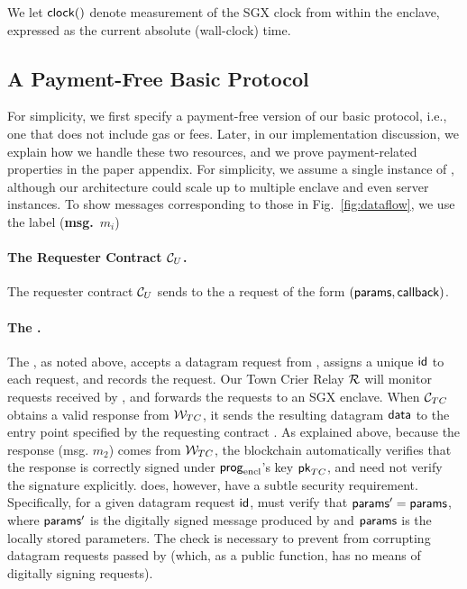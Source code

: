 We let ${{\sf clock}}()$ denote measurement of the SGX clock from within the enclave, expressed as the current absolute (wall-clock) time. 


\subsection{A Payment-Free Basic Protocol}
\label{sec:payment-free-protocol}

For simplicity, we first specify a payment-free version of our basic protocol, i.e., one that does not include gas or fees. Later, in our implementation discussion, we explain how we handle these two resources, and we prove payment-related properties in the paper appendix. For simplicity, we assume a single instance of \engine, although our architecture could scale up to multiple enclave and even server instances. To show messages corresponding to those in Fig.~\ref{fig:dataflow}, we use the label ({\bf msg.}~$m_i$)

\paragraph{The Requester Contract ${\cal C}_U$.}
The requester contract ${\cal C}_U$ sends to the \tcontract \tcont
a request of the form $({\sf params}, {\sf callback})$.

\paragraph{The \tcontract \tcont.} 
The \tcontract, as noted above, accepts a datagram request from \reqcont, 
assigns a unique ${\sf id}$ to each request, and
records the request.
Our Town Crier Relay $\mathcal{R}$ will monitor
requests received by \tcont, and 
forwards the requests to an SGX enclave.
When ${\cal C}_{TC}$ obtains a valid response
from ${\cal W}_{TC}$,   
it 
sends the resulting datagram ${\sf data}$ to the entry point \dgcallback 
specified by the requesting contract \reqcont. As explained above, because the response (msg. $m_2$) comes from ${\cal W}_{TC}$, the blockchain automatically verifies that the response is correctly signed under ${\sf prog}_{\textrm{encl}}$'s key ${\sf pk}_{TC}$, and \tcont need not verify the signature explicitly. \tc does, however, have a subtle security requirement. Specifically,  for a given datagram request ${\sf id}$, \tcont must verify that ${\sf params}' = {\sf params}$, where ${\sf params}'$ is the digitally signed message produced by \engine and ${\sf params}$ is the locally stored parameters. The check is necessary to prevent \relay from corrupting datagram requests passed by \tcont (which, as a public function, has no means of digitally signing requests). 


